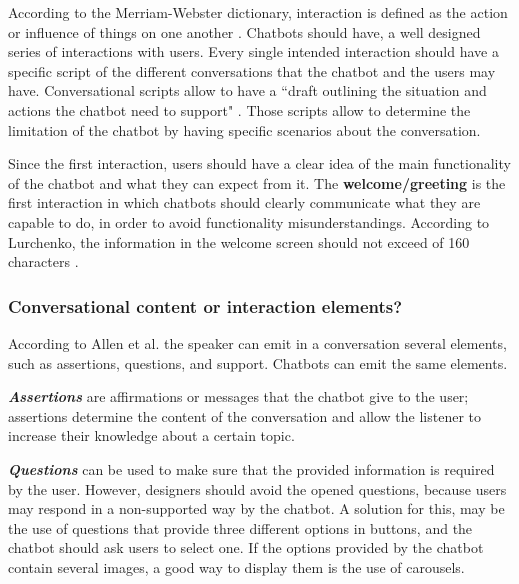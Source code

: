 \documentclass[a4paper,10pt]{article}
\begin{document}
According to the Merriam-Webster dictionary, interaction is defined as the action or influence of things on one another \cite{merriam-webster}.
Chatbots should have, a well designed series of interactions with users. Every single intended interaction should have a specific script of the different conversations that the chatbot and the users may have. Conversational scripts allow to have a ``draft outlining the situation and actions the chatbot need to support" \cite{CaseStudy}. Those scripts allow to determine the limitation of the chatbot by having specific scenarios about the conversation. 

Since the first interaction, users should have a clear idea of the main functionality of the chatbot and what they can expect from it.
The \textbf{welcome/greeting} is the first interaction in which chatbots should clearly communicate what they are capable to do, in order to avoid functionality misunderstandings. According to Lurchenko, the information in the welcome screen should not exceed of 160 characters \cite{CheatSheet}. 

\subsubsection*{Conversational content or interaction elements?}
According to Allen et al. \cite{allen1978conversation} the speaker can emit in a conversation several elements, such as assertions, questions, and support. Chatbots can emit the same elements. 

\textbf{\textit{Assertions}} are affirmations or messages that the chatbot give to the user; assertions determine the content of the conversation and allow the listener to increase their knowledge about a certain topic. 

\textbf{\textit{Questions}} can be used to make sure that the provided information is required by the user. However, designers should avoid the opened questions, because users may respond in a non-supported way by the chatbot. A solution for this, may be the use of questions that provide three different options in buttons, and the chatbot should ask users to select one. If the options provided by the chatbot contain several images, a good way to display them is the use of carousels. 
\end{document}
